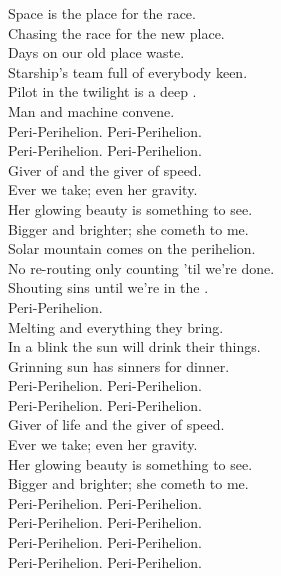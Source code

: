 Space is the place for the  race. \\
Chasing the race for the new place. \\
Days on our old place waste. \\
Starship's team full of everybody keen. \\
Pilot in the twilight is a deep . \\
Man and machine convene. \\

Peri-Perihelion. Peri-Perihelion. \\
Peri-Perihelion. Peri-Perihelion. \\

Giver of  and the giver of speed. \\
Ever we take; even her gravity. \\
Her glowing beauty is something to see. \\
Bigger and brighter; she cometh to me. \\

Solar mountain comes on the perihelion. \\
No re-routing only counting 'til we're done. \\
Shouting sins until we're in the . \\
Peri-Perihelion. \\
Melting  and everything they bring. \\
In a blink the sun will drink their things. \\
Grinning sun has sinners for dinner. \\

Peri-Perihelion. Peri-Perihelion. \\
Peri-Perihelion. Peri-Perihelion. \\

Giver of life and the giver of speed. \\
Ever we take; even her gravity. \\
Her glowing beauty is something to see. \\
Bigger and brighter; she cometh to me. \\

Peri-Perihelion. Peri-Perihelion. \\
Peri-Perihelion. Peri-Perihelion. \\
Peri-Perihelion. Peri-Perihelion. \\
Peri-Perihelion. Peri-Perihelion. \\

